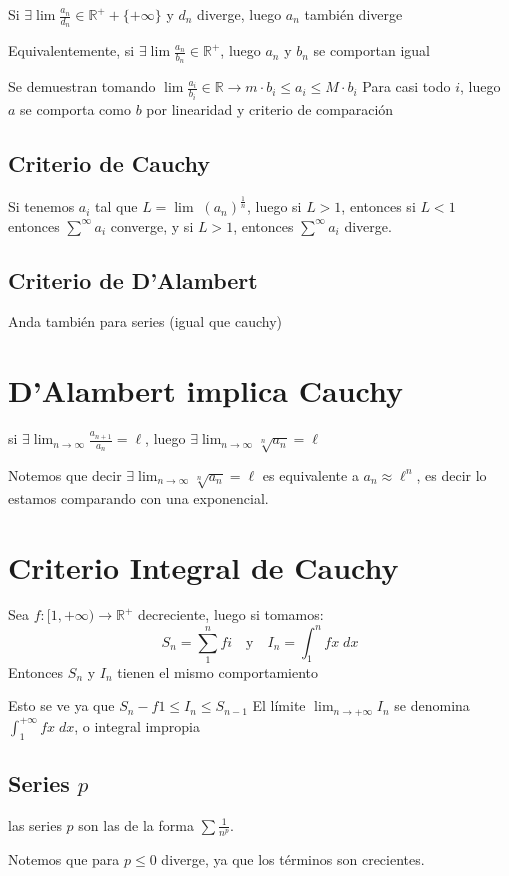 \documentclass{article}
\def\R{\mathbb{R}}
\begin{document}
Si $\exists \lim \frac{a_n}{d_n} \in \R^+ + \{+\infty\}$
y $d_n$ diverge, luego $a_n$ también diverge

Equivalentemente, si $\exists \lim \frac{a_n}{b_n} \in \R^+$, luego $a_n$ y
$b_n$ se comportan igual

Se demuestran tomando $\lim \frac{a_i}{b_i} \in \R \to m \cdot b_i \leq a_i
\leq M \cdot b_i$ Para casi todo $i$, luego $a$ se comporta como $b$ por
linearidad y criterio de comparación
\subsection{Criterio de Cauchy}
Si tenemos $a_i$ tal que $L = \lim \; (a_n)^\frac{1}{n}$, luego si $L > 1$,
entonces si $L < 1$ entonces $\sum^{\infty} a_i$ converge, y si $L > 1$,
entonces $\sum^{\infty} a_i$ diverge.

\subsection{Criterio de D'Alambert}
Anda también para series (igual que cauchy)

\section{D'Alambert implica Cauchy}
si $\exists \lim_{n \to \infty} \frac{a_{n+1}}{a_n} = \ell$, luego \(
\exists \lim_{n \to \infty} \sqrt[n]{a_n} = \ell
\)

Notemos que decir \(
\exists \lim_{n \to \infty} \sqrt[n]{a_n} = \ell
\) es equivalente a \(
	a_n \approx \ell^n
\), es decir lo estamos comparando con una exponencial.
\section{Criterio Integral de Cauchy}
Sea $f : [1, +\infty) \to \R^+$ decreciente, luego si tomamos:
\[
	S_n = \sum_1^n fi \quad \text{y} \quad I_n = \int_1^n fx \; dx
\]
Entonces $S_n$ y $I_n$ tienen el mismo comportamiento

Esto se ve ya que $S_n - f1 \leq I_n \leq S_{n-1}$
El límite $\lim _{n \to +\infty} I_n$ se denomina $\int_1^{+\infty} fx \;
dx$, o integral impropia

\subsection{Series $p$}
las series $p$ son las de la forma $\sum \frac{1}{n^p}$.

Notemos que para $p \leq 0$ diverge, ya que los términos son crecientes.
\end{document}
